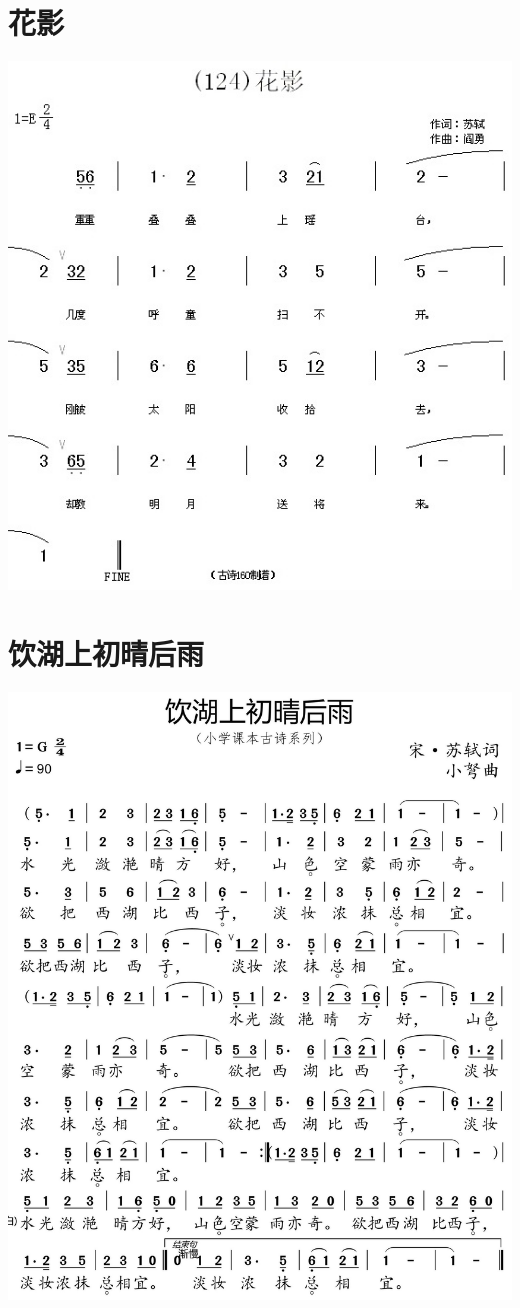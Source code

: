\documentclass[cn,pad,twocol]{elegantbook}
\begin{document}
\section{花影}
    \includegraphics[width=\textwidth]{dongxiao/20200627-苏轼-花影.jpg} 
\section{饮湖上初晴后雨}
    \includegraphics[width=\textwidth]{dongxiao/20200627-苏轼-饮湖上初晴后雨.jpg} 
\end{document}
